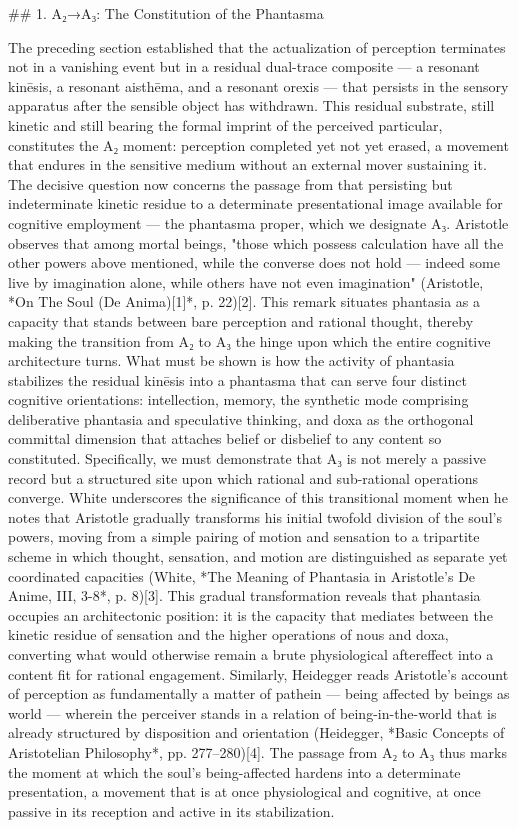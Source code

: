 ## 1. A₂→A₃: The Constitution of the Phantasma

The preceding section established that the actualization of perception terminates not in a vanishing event but in a residual dual-trace composite — a resonant kinēsis, a resonant aisthēma, and a resonant orexis — that persists in the sensory apparatus after the sensible object has withdrawn. This residual substrate, still kinetic and still bearing the formal imprint of the perceived particular, constitutes the A₂ moment: perception completed yet not yet erased, a movement that endures in the sensitive medium without an external mover sustaining it. The decisive question now concerns the passage from that persisting but indeterminate kinetic residue to a determinate presentational image available for cognitive employment — the phantasma proper, which we designate A₃. Aristotle observes that among mortal beings, "those which possess calculation have all the other powers above mentioned, while the converse does not hold — indeed some live by imagination alone, while others have not even imagination" (Aristotle, *On The Soul (De Anima)[1]*, p. 22)[2]. This remark situates phantasia as a capacity that stands between bare perception and rational thought, thereby making the transition from A₂ to A₃ the hinge upon which the entire cognitive architecture turns. What must be shown is how the activity of phantasia stabilizes the residual kinēsis into a phantasma that can serve four distinct cognitive orientations: intellection, memory, the synthetic mode comprising deliberative phantasia and speculative thinking, and doxa as the orthogonal committal dimension that attaches belief or disbelief to any content so constituted. Specifically, we must demonstrate that A₃ is not merely a passive record but a structured site upon which rational and sub-rational operations converge. White underscores the significance of this transitional moment when he notes that Aristotle gradually transforms his initial twofold division of the soul's powers, moving from a simple pairing of motion and sensation to a tripartite scheme in which thought, sensation, and motion are distinguished as separate yet coordinated capacities (White, *The Meaning of Phantasia in Aristotle's De Anime, III, 3-8*, p. 8)[3]. This gradual transformation reveals that phantasia occupies an architectonic position: it is the capacity that mediates between the kinetic residue of sensation and the higher operations of nous and doxa, converting what would otherwise remain a brute physiological aftereffect into a content fit for rational engagement. Similarly, Heidegger reads Aristotle's account of perception as fundamentally a matter of pathein — being affected by beings as world — wherein the perceiver stands in a relation of being-in-the-world that is already structured by disposition and orientation (Heidegger, *Basic Concepts of Aristotelian Philosophy*, pp. 277–280)[4]. The passage from A₂ to A₃ thus marks the moment at which the soul's being-affected hardens into a determinate presentation, a movement that is at once physiological and cognitive, at once passive in its reception and active in its stabilization. 

